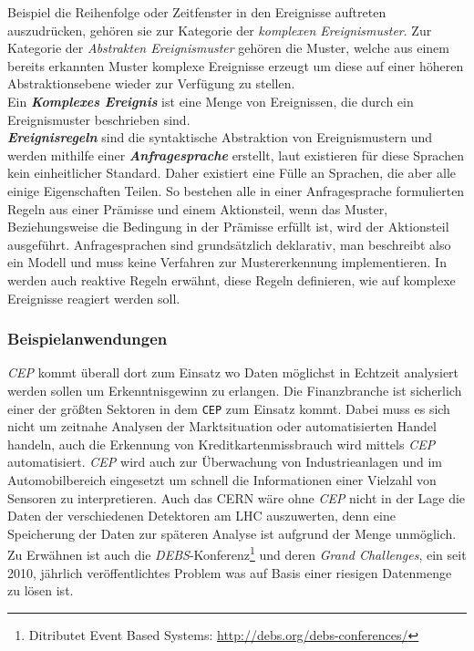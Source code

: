 \documentclass{acm_proc_article-sp}
\begin{document}
Beispiel die Reihenfolge oder Zeitfenster in den Ereignisse auftreten auszudrücken, 
gehören sie zur Kategorie der \textit{komplexen Ereignismuster}. Zur Kategorie der 
\textit{Abstrakten Ereignismuster} gehören die Muster, welche aus einem bereits erkannten 
Muster komplexe Ereignisse erzeugt um diese auf einer höheren Abstraktionsebene wieder 
zur Verfügung zu stellen.\\
Ein \textbf{\textit{Komplexes Ereignis}} ist eine Menge von Ereignissen, die durch ein 
Ereignismuster beschrieben sind.\\\label{begriff-ereignisregel}
\textbf{\textit{Ereignisregeln}} sind die syntaktische Abstraktion von Ereignismustern 
und werden mithilfe einer \textbf{\textit{Anfragesprache}} erstellt, laut \cite{bruns} 
existieren für diese 
Sprachen kein einheitlicher Standard. Daher existiert eine Fülle an Sprachen, die aber 
alle einige Eigenschaften Teilen. So bestehen alle in einer Anfragesprache formulierten 
Regeln aus einer Prämisse und einem Aktionsteil, wenn das Muster, Beziehungsweise die 
Bedingung in der Prämisse erfüllt ist, wird der Aktionsteil ausgeführt. Anfragesprachen 
sind grundsätzlich deklarativ, man beschreibt also ein Modell und muss keine Verfahren 
zur Mustererkennung implementieren. In \cite{eckert} werden auch reaktive Regeln erwähnt, 
diese Regeln definieren, wie auf komplexe Ereignisse reagiert werden soll.

\subsubsection{Beispielanwendungen}
\vspace{0.1cm}

\textit{CEP} kommt überall dort zum Einsatz wo Daten möglichst in Echtzeit analysiert 
werden sollen um Erkenntnisgewinn zu erlangen. Die Finanzbranche ist sicherlich einer der 
größten Sektoren in dem \texttt{CEP} zum Einsatz kommt. Dabei muss es sich nicht um 
zeitnahe Analysen der Marktsituation oder automatisierten Handel handeln, auch die 
Erkennung von 
Kreditkartenmissbrauch wird mittels \textit{CEP} automatisiert. \textit{CEP} wird auch 
zur Überwachung von Industrieanlagen und im Automobilbereich eingesetzt um schnell die 
Informationen einer Vielzahl von Sensoren zu interpretieren. Auch das CERN wäre ohne 
\textit{CEP} nicht in der Lage die Daten der verschiedenen Detektoren am LHC auszuwerten, 
denn eine Speicherung der Daten zur späteren Analyse ist aufgrund der Menge unmöglich.\\
Zu Erwähnen ist auch die \textit{DEBS}-Konferenz\footnote{Ditributet Event Based Systems: 
\url{http://debs.org/debs-conferences/}} und deren \textit{Grand Challenges}, ein seit 
2010, jährlich veröffentlichtes Problem was auf Basis einer riesigen Datenmenge zu lösen 
ist.
\end{document}
